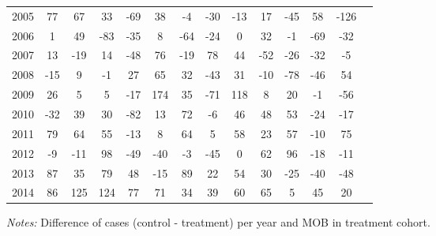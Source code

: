 \begin{table}[H]
\begin{threeparttable}
{\begin{tabular}{l*{13}{c}}
2005        &          77&          67&          33&         -69&          38&          -4&         -30&         -13&          17&         -45&          58&        -126\\
2006        &           1&          49&         -83&         -35&           8&         -64&         -24&           0&          32&          -1&         -69&         -32\\
2007        &          13&         -19&          14&         -48&          76&         -19&          78&          44&         -52&         -26&         -32&          -5\\
2008        &         -15&           9&          -1&          27&          65&          32&         -43&          31&         -10&         -78&         -46&          54\\
2009        &          26&           5&           5&         -17&         174&          35&         -71&         118&           8&          20&          -1&         -56\\
2010        &         -32&          39&          30&         -82&          13&          72&          -6&          46&          48&          53&         -24&         -17\\
2011        &          79&          64&          55&         -13&           8&          64&           5&          58&          23&          57&         -10&          75\\
2012        &          -9&         -11&          98&         -49&         -40&          -3&         -45&           0&          62&          96&         -18&         -11\\
2013        &          87&          35&          79&          48&         -15&          89&          22&          54&          30&         -25&         -40&         -48\\
2014        &          86&         125&         124&          77&          71&          34&          39&          60&          65&           5&          45&          20\\
 \bottomrule \end{tabular} } \begin{tablenotes} \item \scriptsize \emph{Notes:} Difference of cases (control - treatment) per year and MOB in treatment cohort. \end{tablenotes} \end{threeparttable} \end{table} 
